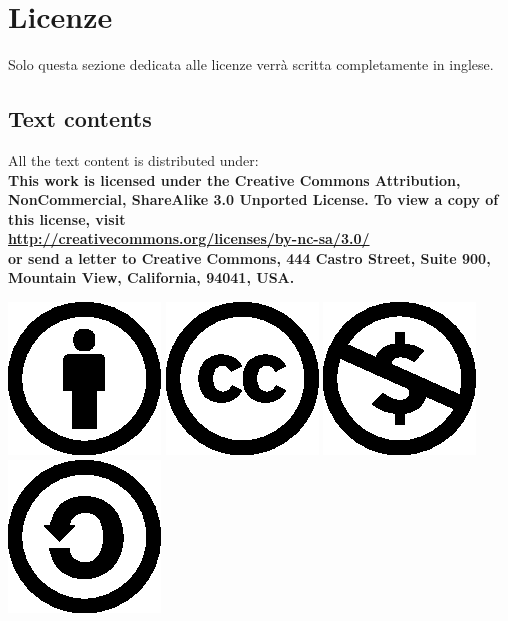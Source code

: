 \newpage

\section*{Licenze}

Solo questa sezione dedicata alle licenze verr\`a scritta completamente in
inglese.

\subsection*{Text contents}
All the text content is distributed under:\\
\textbf{ This work is licensed under the Creative Commons Attribution,
  NonCommercial, ShareAlike 3.0 Unported License. To view a
  copy of this license, visit\\
  \href{http://creativecommons.org/licenses/by-nc-sa/3.0/}{http://creativecommons.org/licenses/by-nc-sa/3.0/}\\
  or send a letter to Creative Commons, 444 Castro Street, Suite 900,
  Mountain View, California, 94041, USA.}

\begin{center}
\includegraphics{cc-icons-eps/by}
\includegraphics{cc-icons-eps/cc}
\includegraphics{cc-icons-eps/nc}
\includegraphics{cc-icons-eps/sa}
\end{center}

